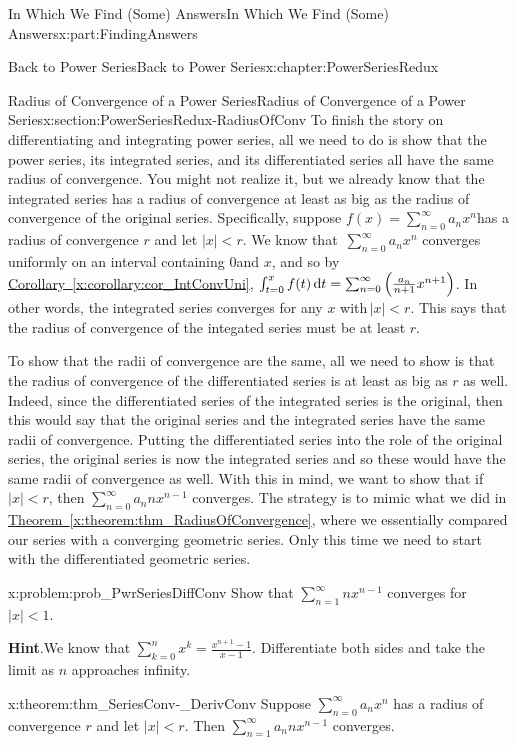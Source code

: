 \documentclass[oneside,10pt,]{book}
\newcommand{\blocktitlefont}{\relax}
\newcommand{\xreffont}{\relax}
\numberwithin{equation}{section}
\newcommand{\dx}[1]{\,{\rm d}#1}
\newcommand{\lt}{<}
\begin{document}
\begin{partptx}{In Which We Find (Some) Answers}{}{In Which We Find (Some) Answers}{}{}{x:part:FindingAnswers}
\begin{chapterptx}{Back to Power Series}{}{Back to Power Series}{}{}{x:chapter:PowerSeriesRedux}
\begin{sectionptx}{Radius of Convergence of a Power Series}{}{Radius of Convergence of a Power Series}{}{}{x:section:PowerSeriesRedux-RadiusOfConv}
To finish the story on differentiating and integrating power series, all we need to do is show that the power series, its integrated series, and its differentiated series all have the same radius of convergence. You might not realize it, but we already know that the integrated series has a radius of convergence at least as big as the radius of convergence of the original series. Specifically, suppose \(f(x)=\sum_{n=0}^\infty a_nx^n\)has a radius of convergence \(r\) and let \(|x|\lt r\). We know that \(\,\sum_{n=0}^\infty a_nx^n\) converges uniformly on an interval containing \(0\)and \(x\), and so by \hyperref[x:corollary:cor_IntConvUni]{Corollary~{\xreffont\ref{x:corollary:cor_IntConvUni}}}, \(\int_{t=0}^xf(t)\dx{ t}=\sum_{n=0}^\infty\left(\frac{a_n}{n+1}x^{n+1}\right)\). In other words, the integrated series converges for any \(x\) with\(\,|x|\lt r\). This says that the radius of convergence of the integated series must be at least \(r\).%
\par
To show that the radii of convergence are the same, all we need to show is that the radius of convergence of the differentiated series is at least as big as \(r\) as well. Indeed, since the differentiated series of the integrated series is the original, then this would say that the original series and the integrated series have the same radii of convergence. Putting the differentiated series into the role of the original series, the original series is now the integrated series and so these would have the same radii of convergence as well. With this in mind, we want to show that if \(|x|\lt r\), then \(\sum_{n=0}^\infty a_nnx^{n-1}\) converges. The strategy is to mimic what we did in \hyperref[x:theorem:thm_RadiusOfConvergence]{Theorem~{\xreffont\ref{x:theorem:thm_RadiusOfConvergence}}}, where we essentially compared our series with a converging geometric series. Only this time we need to start with the differentiated geometric series.%
\begin{problem}{}{x:problem:prob_PwrSeriesDiffConv}%
Show that \(\sum_{n=1}^\infty nx^{n-1}\) converges for \(|x|\lt 1\).%
\par\smallskip%
\noindent\textbf{\blocktitlefont Hint}.\hypertarget{g:hint:idp316}{}\quad{}We know that \(\sum_{k=0}^nx^k=\frac{x^{n+1}-1}{x-1}\). Differentiate both sides and take the limit as \(n\) approaches infinity.%
\end{problem}
\begin{theorem}{}{}{x:theorem:thm_SeriesConv-_DerivConv}%
 Suppose \(\sum_{n=0}^\infty a_nx^n\) has a radius of convergence \(r\) and let \(|x|\lt r\). Then \(\sum_{n=1}^\infty a_nnx^{n-1}\) converges.%

\end{theorem}
\end{sectionptx}
\end{chapterptx}
\end{partptx}
\end{document}
